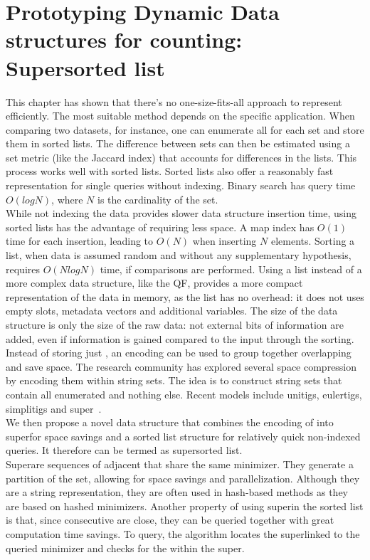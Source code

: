 \section{Prototyping Dynamic Data structures for \kmer counting: Super\kmer sorted list}
\label{sec:skmers}
This chapter has shown that there's no one-size-fits-all approach to represent \kmers efficiently. The most suitable method depends on the specific application. When comparing two datasets, for instance, one can enumerate all \kmers for each set and store them in sorted lists. The difference between sets can then be estimated using a set metric (like the Jaccard index) that accounts for \kmer differences in the lists. This process works well with sorted lists. Sorted \kmer lists also offer a reasonably fast representation for single \kmer queries without indexing. Binary search has query time $O(log{N})$, where $N$ is the cardinality of the set.\\
While not indexing the data provides slower data structure insertion time, using sorted lists has the advantage of requiring less space. A map index has $O(1)$ time for each insertion, leading to $O(N)$ when inserting $N$ elements. Sorting a list, when data is assumed random and without any supplementary hypothesis, requires $O(Nlog{N})$ time, if comparisons are performed. Using a list instead of a more complex data structure, like the QF, provides a more compact representation of the data in memory, as the list has no overhead: it does not uses empty slots, metadata vectors and additional variables. The size of the data structure is only the size of the raw data: not external bits of information are added, even if information is gained compared to the input through the sorting.\\
Instead of storing just \kmers, an encoding can be used to group together overlapping \kmers and save space. The \kmer research community has explored several space compression by encoding them within string sets. The idea is to construct string sets that contain all enumerated \kmers and nothing else. Recent models include unitigs, eulertigs, simplitigs and super\kmers~\cite{marchet2024kmersets}.\\
We then propose a novel data structure that combines the encoding of \kmers into super\kmers for space savings and a sorted list structure for relatively quick non-indexed \kmer queries. It therefore can be termed as super\kmer sorted list.\\
Super\kmers are sequences of adjacent \kmers that share the same minimizer. They generate a partition of the \kmer set, allowing for space savings and parallelization. Although they are a string representation, they are often used in hash-based methods as they are based on hashed minimizers. Another property of using super\kmers in the sorted list is that, since consecutive \kmers are close, they can be queried together with great computation time savings. To query, the algorithm locates the super\kmer linked to the queried \kmer minimizer and checks for the \kmer within the super\kmer.\\
